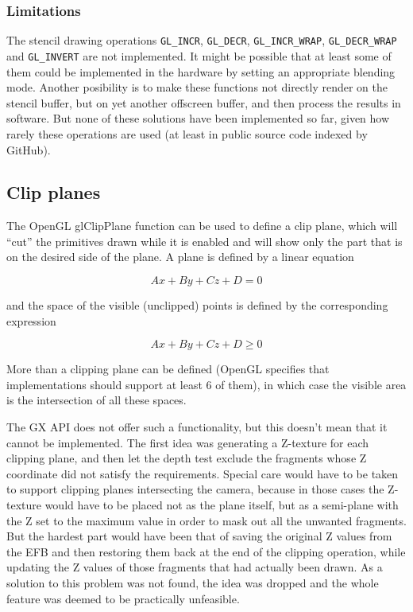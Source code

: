 \documentclass[12pt]{article}
\newcommand{\fname}[1] {{\color{blue}#1}}
\begin{document}
\subsubsection {Limitations}
\label{sec:stencillimitations}

The stencil drawing operations \lstinline{GL_INCR}, \lstinline{GL_DECR}, \lstinline{GL_INCR_WRAP}, \lstinline{GL_DECR_WRAP} and \lstinline{GL_INVERT} are not implemented. It might be possible that at least some of them could be implemented in the hardware by setting an appropriate blending mode. Another posibility is to make these functions not directly render on the stencil buffer, but on yet another offscreen buffer, and then process the results in software. But none of these solutions have been implemented so far, given how rarely these operations are used (at least in public source code indexed by GitHub).


\subsection {Clip planes}

The OpenGL \fname{glClipPlane} function can be used to define a clip plane, which will “cut” the primitives drawn while it is enabled and will show only the part that is on the desired side of the plane. A plane is defined by a linear equation

$$Ax + By + Cz + D = 0$$

and the space of the visible (unclipped) points is defined by the corresponding expression

$$Ax + By + Cz + D \geq 0$$

More than a clipping plane can be defined (OpenGL specifies that implementations should support at least 6 of them), in which case the visible area is the intersection of all these spaces.

The GX API does not offer such a functionality, but this doesn't mean that it cannot be implemented. The first idea was generating a Z-texture for each clipping plane, and then let the depth test exclude the fragments whose Z coordinate did not satisfy the requirements. Special care would have to be taken to support clipping planes intersecting the camera, because in those cases the Z-texture would have to be placed not as the plane itself, but as a semi-plane with the Z set to the maximum value in order to mask out all the unwanted fragments. But the hardest part would have been that of saving the original Z values from the EFB and then restoring them back at the end of the clipping operation, while updating the Z values of those fragments that had actually been drawn. As a solution to this problem was not found, the idea was dropped and the whole feature was deemed to be practically unfeasible.
\end{document}
